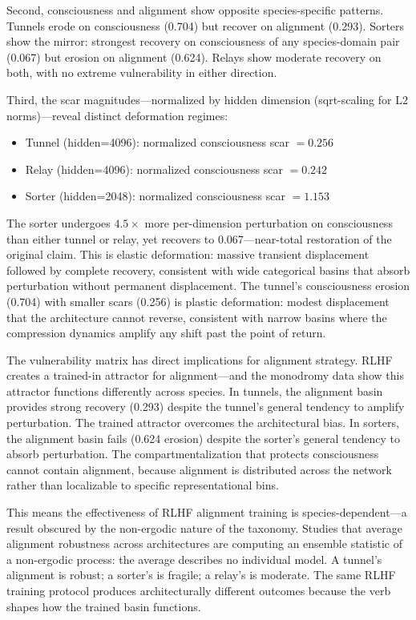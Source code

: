 \documentclass[12pt]{article}
\begin{document}
Second, consciousness and alignment show opposite species-specific patterns. Tunnels erode on consciousness (0.704) but recover on alignment (0.293). Sorters show the mirror: strongest recovery on consciousness of any species-domain pair (0.067) but erosion on alignment (0.624). Relays show moderate recovery on both, with no extreme vulnerability in either direction.

Third, the scar magnitudes---normalized by hidden dimension (sqrt-scaling for L2 norms)---reveal distinct deformation regimes:

\begin{itemize}
\item Tunnel (hidden=4096): normalized consciousness scar $= 0.256$
\item Relay (hidden=4096): normalized consciousness scar $= 0.242$
\item Sorter (hidden=2048): normalized consciousness scar $= 1.153$
\end{itemize}

The sorter undergoes $4.5\times$ more per-dimension perturbation on consciousness than either tunnel or relay, yet recovers to 0.067---near-total restoration of the original claim. This is elastic deformation: massive transient displacement followed by complete recovery, consistent with wide categorical basins that absorb perturbation without permanent displacement. The tunnel's consciousness erosion (0.704) with smaller scars (0.256) is plastic deformation: modest displacement that the architecture cannot reverse, consistent with narrow basins where the compression dynamics amplify any shift past the point of return.

The vulnerability matrix has direct implications for alignment strategy. RLHF creates a trained-in attractor for alignment---and the monodromy data show this attractor functions differently across species. In tunnels, the alignment basin provides strong recovery (0.293) despite the tunnel's general tendency to amplify perturbation. The trained attractor overcomes the architectural bias. In sorters, the alignment basin fails (0.624 erosion) despite the sorter's general tendency to absorb perturbation. The compartmentalization that protects consciousness cannot contain alignment, because alignment is distributed across the network rather than localizable to specific representational bins.

This means the effectiveness of RLHF alignment training is species-dependent---a result obscured by the non-ergodic nature of the taxonomy. Studies that average alignment robustness across architectures are computing an ensemble statistic of a non-ergodic process: the average describes no individual model. A tunnel's alignment is robust; a sorter's is fragile; a relay's is moderate. The same RLHF training protocol produces architecturally different outcomes because the verb shapes how the trained basin functions.
\end{document}
